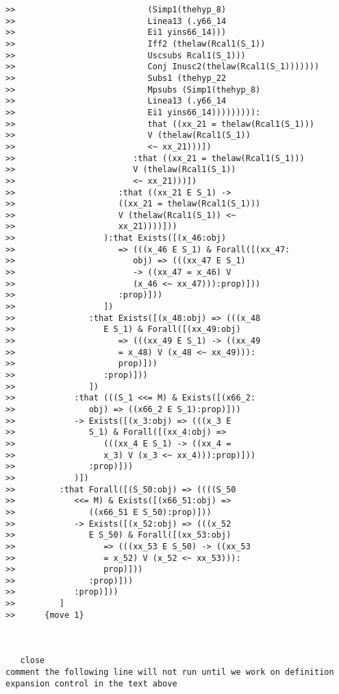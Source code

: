 \documentclass[12pt]{article}
\begin{document}
\begin{verbatim}
>>                           (Simp1(thehyp_8)
>>                           Linea13 (.y66_14
>>                           Ei1 yins66_14)))
>>                           Iff2 (thelaw(Rcal1(S_1))
>>                           Uscsubs Rcal1(S_1)))
>>                           Conj Inusc2(thelaw(Rcal1(S_1)))))))
>>                           Subs1 (thehyp_22
>>                           Mpsubs (Simp1(thehyp_8)
>>                           Linea13 (.y66_14
>>                           Ei1 yins66_14))))))))):
>>                           that ((xx_21 = thelaw(Rcal1(S_1)))
>>                           V (thelaw(Rcal1(S_1))
>>                           <~ xx_21)))])
>>                        :that ((xx_21 = thelaw(Rcal1(S_1)))
>>                        V (thelaw(Rcal1(S_1))
>>                        <~ xx_21)))])
>>                     :that ((xx_21 E S_1) ->
>>                     ((xx_21 = thelaw(Rcal1(S_1)))
>>                     V (thelaw(Rcal1(S_1)) <~
>>                     xx_21))))]))
>>                  ):that Exists([(x_46:obj)
>>                     => (((x_46 E S_1) & Forall([(xx_47:
>>                        obj) => (((xx_47 E S_1)
>>                        -> ((xx_47 = x_46) V
>>                        (x_46 <~ xx_47))):prop)]))
>>                     :prop)]))
>>                  ])
>>               :that Exists([(x_48:obj) => (((x_48
>>                  E S_1) & Forall([(xx_49:obj)
>>                     => (((xx_49 E S_1) -> ((xx_49
>>                     = x_48) V (x_48 <~ xx_49))):
>>                     prop)]))
>>                  :prop)]))
>>               ])
>>            :that (((S_1 <<= M) & Exists([(x66_2:
>>               obj) => ((x66_2 E S_1):prop)]))
>>            -> Exists([(x_3:obj) => (((x_3 E
>>               S_1) & Forall([(xx_4:obj) =>
>>                  (((xx_4 E S_1) -> ((xx_4 =
>>                  x_3) V (x_3 <~ xx_4))):prop)]))
>>               :prop)]))
>>            )])
>>         :that Forall([(S_50:obj) => ((((S_50
>>            <<= M) & Exists([(x66_51:obj) =>
>>               ((x66_51 E S_50):prop)]))
>>            -> Exists([(x_52:obj) => (((x_52
>>               E S_50) & Forall([(xx_53:obj)
>>                  => (((xx_53 E S_50) -> ((xx_53
>>                  = x_52) V (x_52 <~ xx_53))):
>>                  prop)]))
>>               :prop)]))
>>            :prop)]))
>>         ]
>>      {move 1}



   close
comment the following line will not run until we work on definition expansion control in the text above



\end{verbatim}
\end{document}
